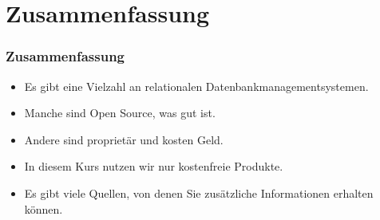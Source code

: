 \documentclass[aspectratio=169,mathserif,notheorems]{beamer}%
\begin{document}
\section{Zusammenfassung}%
%
\begin{frame}%
\frametitle{Zusammenfassung}%
\begin{itemize}%
\item Es gibt eine Vielzahl an relationalen Datenbankmanagementsystemen.%
\item<2-> Manche sind Open Source, was gut ist.%
\item<3-> Andere sind proprietär und kosten Geld.%
\item<4-> In diesem Kurs nutzen wir nur kostenfreie Produkte.%
\item<5-> Es gibt viele Quellen, von denen Sie zusätzliche Informationen erhalten können.%
\end{itemize}%
\end{frame}%
%
\endPresentation%
\end{document}
